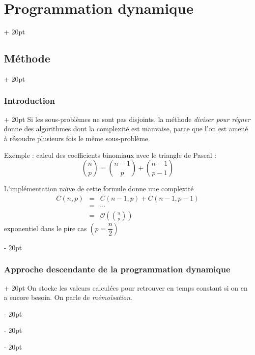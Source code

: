 \documentclass[a4paper, 12pt, twoside]{article}
\newcommand{\lr}[1]{\left( #1 \right)}
\newcommand{\ind}[1][20pt]{\advance\leftskip + #1}
\newcommand{\deind}[1][20pt]{\advance\leftskip - #1}
\newenvironment{indt}[2][20pt]{#2 \par \ind[#1]}{\par \deind} %
\begin{document}
    \vspace{12pt}
    
    \begin{indt}{\section{Programmation dynamique}}
        
        \begin{indt}{\subsection{Méthode}}
            \begin{indt}{\subsubsection{Introduction}}
                Si les sous-problèmes ne sont pas disjoints, la méthode \textit{diviser pour régner} donne des algorithmes dont la complexité est mauvaise, parce que l'on est amené à résoudre plusieurs fois le même sous-problème.
                
                \vspace{6pt}
                
                Exemple : calcul des coefficients binomiaux avec le triangle de Pascal :
                    \[ \binom n p = \binom{n - 1}{p} + \binom{n - 1}{p - 1} \]
                
                L'implémentation naïve de cette formule donne une complexité
                    \[
                        \begin{array}{rcl}
                            C(n, p) &=& C(n - 1, p) + C(n - 1, p - 1)
                            \\
                            &=& \cdots
                            \\
                            &=& \displaystyle \mathcal O\lr{\binom n p}
                        \end{array}
                    \]
                exponentiel dans le pire cas $\lr{p = \dfrac n 2}$
            \end{indt}
            
            \vspace{12pt}
            
            \begin{indt}{\subsubsection{Approche descendante de la programmation dynamique}}
                On stocke les valeurs calculées pour retrouver en temps constant si on en a encore besoin. On parle de \textit{mémoïsation}.
                

\end{indt}
\end{indt}
\end{indt}
\end{document}
